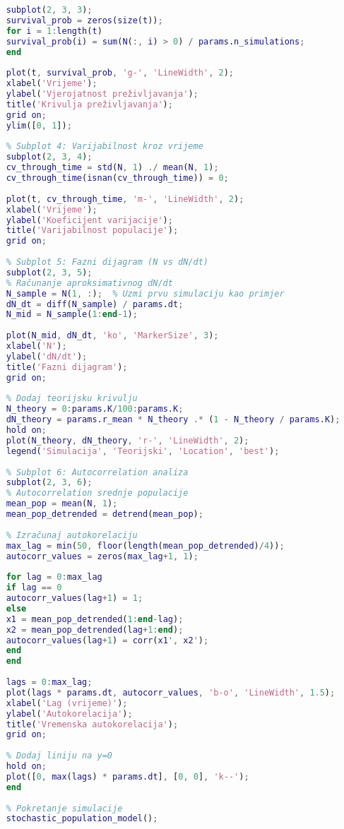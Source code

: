 \documentclass[11pt,oneside]{book}
\begin{document}
\begin{lstlisting}[language=Matlab, caption=Stohastički populacijski model u Octave]
	% Subplot 3: Vjerojatnost preživljavanja kroz vrijeme
	subplot(2, 3, 3);
	survival_prob = zeros(size(t));
	for i = 1:length(t)
	survival_prob(i) = sum(N(:, i) > 0) / params.n_simulations;
	end
	
	plot(t, survival_prob, 'g-', 'LineWidth', 2);
	xlabel('Vrijeme');
	ylabel('Vjerojatnost preživljavanja');
	title('Krivulja preživljavanja');
	grid on;
	ylim([0, 1]);
	
	% Subplot 4: Varijabilnost kroz vrijeme
	subplot(2, 3, 4);
	cv_through_time = std(N, 1) ./ mean(N, 1);
	cv_through_time(isnan(cv_through_time)) = 0;
	
	plot(t, cv_through_time, 'm-', 'LineWidth', 2);
	xlabel('Vrijeme');
	ylabel('Koeficijent varijacije');
	title('Varijabilnost populacije');
	grid on;
	
	% Subplot 5: Fazni dijagram (N vs dN/dt)
	subplot(2, 3, 5);
	% Računanje aproksimativnog dN/dt
	N_sample = N(1, :);  % Uzmi prvu simulaciju kao primjer
	dN_dt = diff(N_sample) / params.dt;
	N_mid = N_sample(1:end-1);
	
	plot(N_mid, dN_dt, 'ko', 'MarkerSize', 3);
	xlabel('N');
	ylabel('dN/dt');
	title('Fazni dijagram');
	grid on;
	
	% Dodaj teorijsku krivulju
	N_theory = 0:params.K/100:params.K;
	dN_theory = params.r_mean * N_theory .* (1 - N_theory / params.K);
	hold on;
	plot(N_theory, dN_theory, 'r-', 'LineWidth', 2);
	legend('Simulacija', 'Teorijski', 'Location', 'best');
	
	% Subplot 6: Autocorrelation analiza
	subplot(2, 3, 6);
	% Autocorrelation srednje populacije
	mean_pop = mean(N, 1);
	mean_pop_detrended = detrend(mean_pop);
	
	% Izračunaj autokorelaciju
	max_lag = min(50, floor(length(mean_pop_detrended)/4));
	autocorr_values = zeros(max_lag+1, 1);
	
	for lag = 0:max_lag
	if lag == 0
	autocorr_values(lag+1) = 1;
	else
	x1 = mean_pop_detrended(1:end-lag);
	x2 = mean_pop_detrended(lag+1:end);
	autocorr_values(lag+1) = corr(x1', x2');
	end
	end
	
	lags = 0:max_lag;
	plot(lags * params.dt, autocorr_values, 'b-o', 'LineWidth', 1.5);
	xlabel('Lag (vrijeme)');
	ylabel('Autokorelacija');
	title('Vremenska autokorelacija');
	grid on;
	
	% Dodaj liniju na y=0
	hold on;
	plot([0, max(lags) * params.dt], [0, 0], 'k--');
	end
	
	% Pokretanje simulacije
	stochastic_population_model();
\end{lstlisting}
\end{document}

